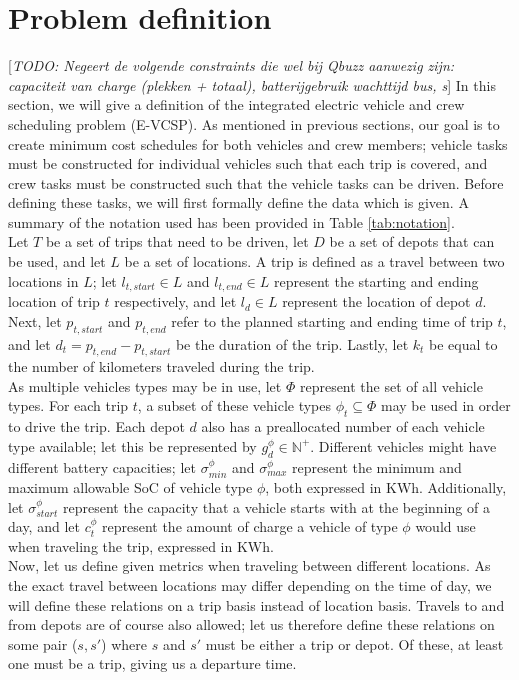 \documentclass[]{article}
\newcommand{\todo}[1]{{\color{red}[\textit{TODO: #1}]}}
\begin{document}
\section{Problem definition}
\label{sec:problem_def}
\todo{Negeert de volgende constraints die wel bij Qbuzz aanwezig zijn: capaciteit van charge (plekken + totaal), batterijgebruik wachttijd bus, s}
In this section, we will give a definition of the integrated electric vehicle and crew scheduling problem (E-VCSP). As mentioned in previous sections, our goal is to create minimum cost schedules for both vehicles and crew members; vehicle tasks must be constructed for individual vehicles such that each trip is covered, and crew tasks must be constructed such that the vehicle tasks can be driven. Before defining these tasks, we will first formally define the data which is given. A summary of the notation used has been provided in Table \ref{tab:notation}. \\
Let $T$ be a set of trips that need to be driven, let $D$ be a set of depots that can be used, and let $L$ be a set of locations. A trip is defined as a travel between two locations in $L$; let $l_{t,start} \in L$ and $l_{t,end} \in L$ represent the starting and ending location of trip $t$ respectively, and let $l_d \in L$ represent the location of depot $d$. Next, let $p_{t,start}$ and $p_{t,end}$ refer to the planned starting and ending time of trip $t$, and let $d_t = p_{t,end} - p_{t,start}$ be the duration of the trip. Lastly, let $k_t$ be equal to the number of kilometers traveled during the trip. \\
As multiple vehicles types may be in use, let $\Phi$ represent the set of all vehicle types. For each trip $t$, a subset of these vehicle types $\phi_t \subseteq \Phi$ may be used in order to drive the trip. Each depot $d$ also has a preallocated number of each vehicle type available; let this be represented by $g^\phi_{d} \in \mathbb{N}^+$. Different vehicles might have different battery capacities; let $\sigma^\phi_{min}$ and $\sigma^\phi_{max}$ represent the minimum and maximum allowable SoC of vehicle type $\phi$, both expressed in KWh. Additionally, let $\sigma^\phi_{start}$ represent the capacity that a vehicle starts with at the beginning of a day, and let $c^\phi_t$ represent the amount of charge a vehicle of type $\phi$ would use when traveling the trip, expressed in KWh. \\
Now, let us define given metrics when traveling between different locations. As the exact travel between locations may differ depending on the time of day, we will define these relations on a trip basis instead of location basis. Travels to and from depots are of course also allowed; let us therefore define these relations on some pair ($s,s'$) where $s$ and $s'$ must be either a trip or depot. Of these, at least one must be a trip, giving us a departure time. \\
\end{document}
